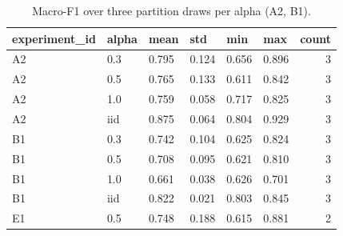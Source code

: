 \begin{table}[htbp]
\centering
\caption{Macro-F1 over three partition draws per alpha (A2, B1).}
\label{Tab_R_PartitionSens}
\footnotesize
\begin{tabular}{llllllr}
\toprule
experiment\_id & alpha & mean & std & min & max & count \\
\midrule
A2 & 0.3 & 0.795 & 0.124 & 0.656 & 0.896 & 3 \\
A2 & 0.5 & 0.765 & 0.133 & 0.611 & 0.842 & 3 \\
A2 & 1.0 & 0.759 & 0.058 & 0.717 & 0.825 & 3 \\
A2 & iid & 0.875 & 0.064 & 0.804 & 0.929 & 3 \\
B1 & 0.3 & 0.742 & 0.104 & 0.625 & 0.824 & 3 \\
B1 & 0.5 & 0.708 & 0.095 & 0.621 & 0.810 & 3 \\
B1 & 1.0 & 0.661 & 0.038 & 0.626 & 0.701 & 3 \\
B1 & iid & 0.822 & 0.021 & 0.803 & 0.845 & 3 \\
E1 & 0.5 & 0.748 & 0.188 & 0.615 & 0.881 & 2 \\
\bottomrule
\end{tabular}
\end{table}
